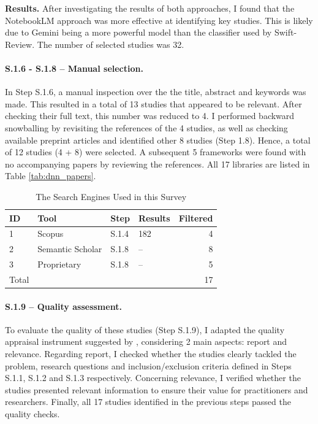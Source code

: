 \textbf{Results.}
After investigating the results of both approaches, I found that the NotebookLM approach was more
effective at identifying key studies. This is likely due to Gemini being a more powerful
model than the classifier used by Swift-Review. The number of selected studies was 32.



\paragraph{S.1.6 - S.1.8 -- Manual selection.}
In Step S.1.6, a manual inspection over the the title, abstract and keywords was made. This
resulted in a total of 13 studies that appeared to be relevant. After checking their full text,
this number was reduced to 4. I performed backward snowballing \cite{jalali_systematic_2012} by
revisiting the references of the 4 studies, as well as checking available preprint articles and
identified other 8 studies (Step 1.8). Hence, a total of 12 studies (4 + 8) were selected. A
subsequent 5 frameworks were found with no accompanying papers by reviewing the references. All 17
libraries are listed in Table \ref{tab:dnn_papers}.

\begin{table}[h!]
	\centering
	\caption{The Search Engines Used in this Survey}
	\label{tab:databases}
	\begin{tabular}{llllr}
		\hline
		ID    & Tool             & Step  & Results & Filtered \\
		\hline
		1     & Scopus           & S.1.4 & 182     & 4        \\
		2     & Semantic Scholar & S.1.8 & --      & 8        \\
		3     & Proprietary      & S.1.8 & --      & 5        \\
		\hline
		Total &                  &       &         & 17       \\
	\end{tabular}
\end{table}

\paragraph{S.1.9 -- Quality assessment.}
To evaluate the quality of these studies (Step S.1.9), I adapted the quality appraisal instrument
suggested by \cite{zhou_map_2016}, considering 2 main aspects: report and relevance. Regarding
report, I checked whether the studies clearly tackled the problem, research questions and
inclusion/exclusion criteria defined in Steps S.1.1, S.1.2 and S.1.3 respectively. Concerning
relevance, I verified whether the studies presented relevant information to ensure their value for
practitioners and researchers. Finally, all 17 studies identified in the previous steps passed the
quality checks.

